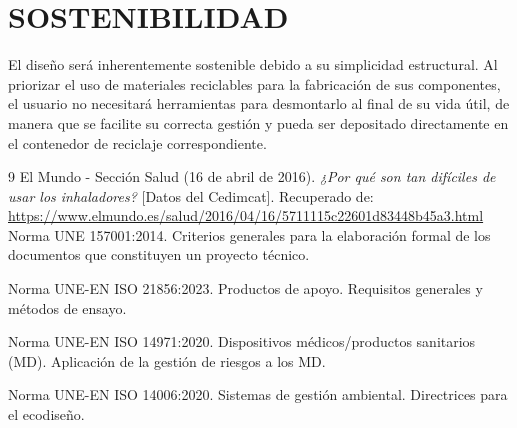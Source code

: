 \documentclass[11pt,a4paper]{article}
\begin{document}
    



\section{SOSTENIBILIDAD}
El diseño será inherentemente sostenible debido a su simplicidad estructural. Al priorizar el uso de materiales reciclables para la fabricación de sus componentes, el usuario no necesitará herramientas para desmontarlo al final de su vida útil, de manera que se facilite su correcta gestión y pueda ser depositado directamente en el contenedor de reciclaje correspondiente.
\newline



\renewcommand{\refname}{8. BIBLIOGRAFÍA Y NORMATIVA TÉCNICA}

\begin{thebibliography}{9}
    El Mundo - Sección Salud (16 de abril de 2016). \textit{¿Por qué son tan difíciles de usar los inhaladores?} [Datos del Cedimcat]. Recuperado de: \url{https://www.elmundo.es/salud/2016/04/16/5711115c22601d83448b45a3.html}
    Norma UNE 157001:2014. Criterios generales para la elaboración formal de los documentos que constituyen un proyecto técnico.

    Norma UNE-EN ISO 21856:2023. Productos de apoyo. Requisitos generales y métodos de ensayo.

Norma UNE-EN ISO 14971:2020. Dispositivos médicos/productos sanitarios (MD). Aplicación de la gestión de riesgos a los MD.

    Norma UNE-EN ISO 14006:2020. Sistemas de gestión ambiental. Directrices para el ecodiseño.
\end{thebibliography}
\end{document}
